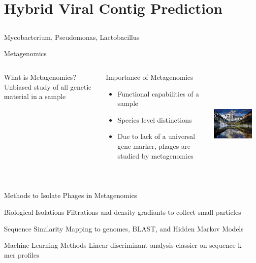 \documentclass[11pt, xcolor=table]{beamer}
\begin{document}
	
\section{Hybrid Viral Contig Prediction}
\subsection{}
  Mycobacterium, Pseudomonas, Lactobacillus
  \begin{frame}{Metagenomics}
	\begin{columns}
	\begin{block}{What is Metagenomics?}
	Unbiased study of all genetic material in a sample
	\end{block}
	\begin{block}{Importance of Metagenomics}
	\begin{itemize}
	\item Functional capabilities of a sample
	\item Species level distinctions
	\item Due to lack of a universal gene marker, phages are studied by metagenomics
	\end{itemize}
	\end{block}
	
	\includegraphics[height=5.5cm, width=5cm]{mosaic.png}
	\end{columns}
	\end{frame}

  \begin{frame}{Methods to Isolate Phages in Metagenomics}
  \begin{block}{Biological Isolations}
  Filtrations and density gradiants to collect small particles
  \end{block}
  \begin{block}{Sequence Similarity}
  Mapping to genomes, BLAST, and Hidden Markov Models
  \end{block}
  \begin{block}{Machine Learning Methods}
  Linear discriminant analysis classier on sequence k-mer profiles
  \end{block}
  \end{frame}
  
\end{document}
